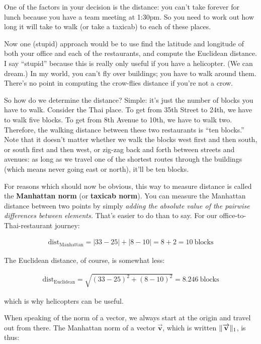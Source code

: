 One of the factors in your decision is the distance: you can't take forever for
lunch because you have a team meeting at 1:30pm. So you need to work out how
long it will take to walk (or take a taxicab) to each of these places. 

Now one (stupid) approach would be to use find the latitude and longitude of
both your office and each of the restaurants, and compute the Euclidean
distance. I say ``stupid'' because this is really only useful if you have a
helicopter. (We can dream.) In my world, you can't fly over buildings; you have
to walk around them. There's no point in computing the crow-flies distance if
you're not a crow.

So how do we determine the distance? Simple: it's just the number of blocks you
have to walk. Consider the Thai place. To get from 35th Street to 24th, we have
to walk five blocks. To get from 8th Avenue to 10th, we have to walk two.
Therefore, the walking distance between these two restaurants is ``ten
blocks.'' Note that it doesn't matter whether we walk the blocks west first and
then south, or south first and then west, or zig-zag back and forth between
streets and avenues: as long as we travel one of the shortest routes through
the buildings (which means never going east or north), it'll be ten blocks.

For reasons which should now be obvious, this way to measure distance is called
the \textbf{Manhattan norm} (or \textbf{taxicab norm}). You can measure the
Manhattan distance between two points by simply \textit{adding the absolute
value of the pairwise differences between elements.} That's easier to do than
to say. For our office-to-Thai-restaurant journey:

\vspace{-.15in}
\begin{align*}
\textrm{dist}_\textrm{Manhattan} = |33-25| + |8-10| = 8 + 2 = 10\ 
\textrm{blocks}
\end{align*}

The Euclidean distance, of course, is somewhat less:

\vspace{-.15in}
\begin{align*}
\textrm{dist}_\textrm{Euclidean} = \sqrt{(33-25)^2 + (8-10)^2} = 8.246\ 
\textrm{blocks}
\end{align*}

which is why helicopters can be useful.

When speaking of the norm of a vector, we always start at the origin and travel
out from there. The Manhattan norm of a vector $\overrightarrow{\textbf{v}}$,
which is written $\lVert\overrightarrow{\textbf{v}}\rVert_1$, is thus: 

